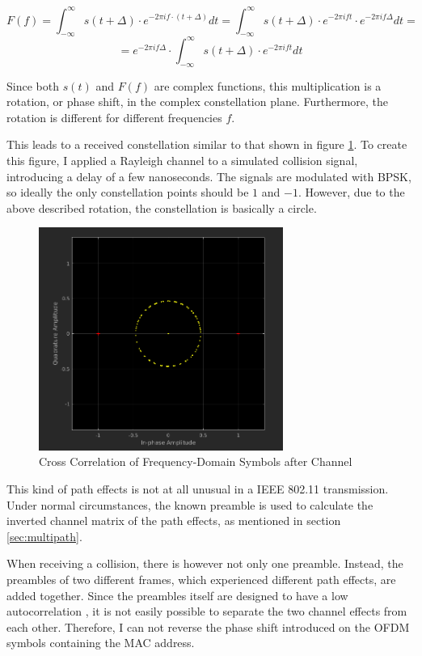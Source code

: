 $$ F(f) = \int_{-\infty}^{\infty} s(t + \Delta) \cdot e^{-2 \pi i f \cdot (t + \Delta)} dt = \int_{-\infty}^{\infty} s(t + \Delta) \cdot e^{-2 \pi i f t} \cdot e^{-2 \pi i f \Delta} dt = $$
$$ = e^{-2 \pi i f \Delta} \cdot \int_{-\infty}^{\infty} s(t + \Delta) \cdot e^{-2 \pi i f t} dt $$\vspace{0cm}

Since both $ s(t) $ and $ F(f) $ are complex functions, this multiplication is a rotation, or phase shift, in the complex constellation plane. Furthermore, the rotation is different for different frequencies $ f $.

This leads to a received constellation similar to that shown in figure \ref{fig:freqd-corr}. To create this figure, I applied a Rayleigh channel \cite{NEEDED} to a simulated collision signal, introducing a delay of a few nanoseconds. The signals are modulated with BPSK, so ideally the only constellation points should be $ 1 $ and $ -1 $. However, due to the above described rotation, the constellation is basically a circle.

\begin{figure}[ht]
	\centering
	\includegraphics[width=8cm]{gfx/images/freqd-correlation}
	\caption{Cross Correlation of Frequency-Domain Symbols after Channel}
	\label{fig:freqd-corr}
\end{figure}

This kind of path effects is not at all unusual in a IEEE 802.11 transmission. Under normal circumstances, the known preamble is used to calculate the inverted channel matrix of the path effects, as mentioned in section \ref{sec:multipath}.

When receiving a collision, there is however not only one preamble. Instead, the preambles of two different frames, which experienced different path effects, are added together. Since the preambles itself are designed to have a low autocorrelation \cite{NEEDED}, it is not easily possible to separate the two channel effects from each other. Therefore, I can not reverse the phase shift introduced on the OFDM symbols containing the MAC address.


